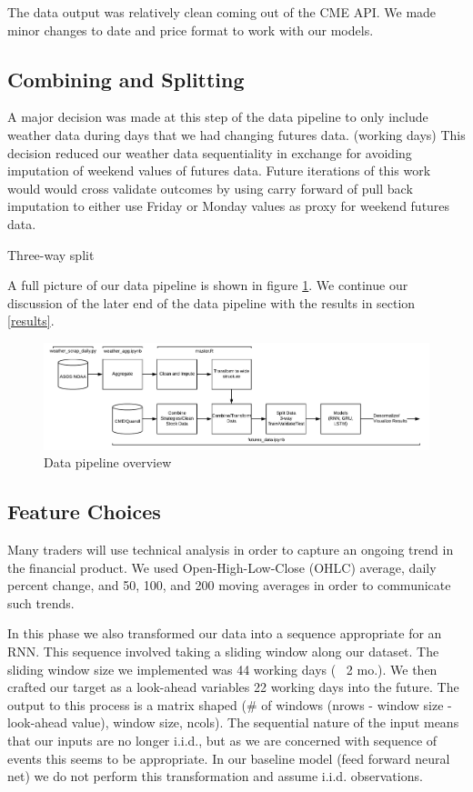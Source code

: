 \documentclass[twoside,11pt]{article}
\begin{document}
The data output was relatively clean coming out of the CME API. We made minor changes to date and price format to work with our models.

\subsection{Combining and Splitting}

A major decision was made at this step of the data pipeline to only include weather data during days that we had changing futures data. (working days) This decision reduced our weather data sequentiality in exchange for avoiding imputation of weekend values of futures data. Future iterations of this work would would cross validate outcomes by using carry forward of pull back imputation to either use Friday or Monday values as proxy for weekend futures data. 

Three-way split

A full picture of our data pipeline is shown in figure \ref{fig:datapipeline}. We continue our discussion of the later end of the data pipeline with the results in section \ref{results}.

\begin{figure}[htbp]
	\centering
	\includegraphics[width=5in]{DataPipeline.png}
	\caption{Data pipeline overview}
	\label{fig:datapipeline}
\end{figure}


\subsection{Feature Choices}

Many traders will use technical analysis in order to capture an ongoing trend in the financial product. We used Open-High-Low-Close (OHLC) average, daily percent change, and 50, 100, and 200 moving averages in order to communicate such trends.  

In this phase we also transformed our data into a sequence appropriate for an RNN. This sequence involved taking a sliding window along our dataset. The sliding window size we implemented was 44 working days (~ 2 mo.). We then crafted our target as a look-ahead variables 22 working days into the future. The output to this process is a matrix shaped (\# of windows (nrows - window size - look-ahead value), window size, ncols). The sequential nature of the input means that our inputs are no longer i.i.d., but as we are concerned with sequence of events this seems to be appropriate. In our baseline model (feed forward neural net) we do not perform this transformation and assume i.i.d. observations. 
\end{document}
